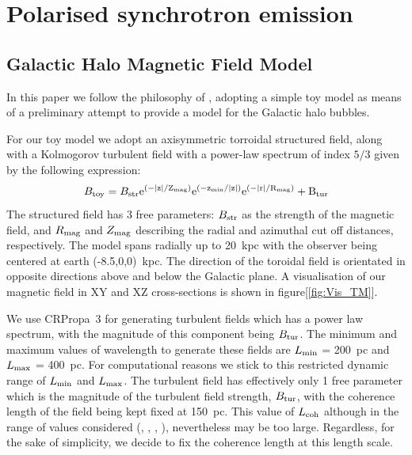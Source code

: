 \documentclass[usenatbib]{mnras}
\begin{document}
\section{Polarised synchrotron emission}
\label{Methods}

\subsection{Galactic Halo Magnetic Field Model}
\label{GMF}
In this paper we follow the philosophy of \cite{West_Helicity}, adopting a simple toy model as means of a preliminary attempt to provide a model for the Galactic halo bubbles. 

For our toy model we adopt an axisymmetric torroidal structured field, along with a Kolmogorov turbulent field with a power-law spectrum of index $5/3$ given by the following expression:
\begin{equation}\label{TM_equation}
B_{\rm{toy}}= B_{\rm{str}}\rm{e}^{{(-|z|}/Z_{\rm{mag}})} \rm{e}^{(-z_{\rm{min}}/|z|)}\rm{e}^{(-|r|/R_{\rm{mag}})} + B_{\rm{tur}}
\end{equation}
The structured field has 3 free parameters: $B_{\rm str}$ as the strength of the magnetic field, and $R_{\rm {mag}}$ and $Z_{\rm {mag}}$ describing the radial and azimuthal cut off distances, respectively. The model spans radially up to 20~kpc with the observer being centered at earth (-8.5,0,0)~kpc. The direction of the toroidal field is orientated in opposite directions above and below the Galactic plane. A visualisation of our magnetic field in XY and XZ cross-sections is shown in figure[\ref{fig:Vis_TM}]. 

We use CRPropa~3 \cite{CRPropa3_2016} for generating turbulent fields which has a power law spectrum, with the magnitude of this component being $B_{\rm{tur}}$. 
The minimum and maximum values of wavelength to generate these fields are  $L_{\rm min}$ = 200~pc and $L_{\rm max}$ = 400~pc. For computational reasons we stick to this restricted dynamic range of $L_{\rm min}$ and $L_{\rm max}$. The turbulent field has effectively only 1 free parameter which is the magnitude of the turbulent field strength, $ B_{\rm tur}$, with the coherence length of the field being kept fixed at 150~pc. This value of $L_{\rm coh}$ although in the range of values considered (\cite{Giacinti_2018}, \cite{Haverkorn_2013}, \cite{Chepurnov_2010}, \cite{Ohno_1993}), nevertheless may be too large. Regardless, for the sake of simplicity, we decide to fix the coherence length at this length scale.
\end{document}
